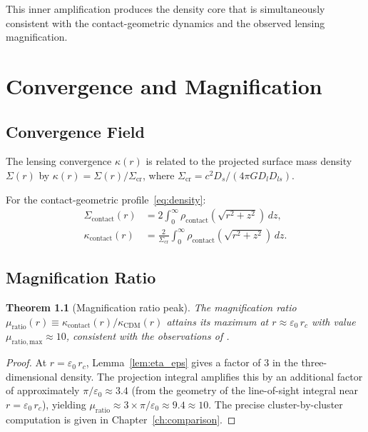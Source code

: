 \documentclass[11pt,a4paper,openright]{book}
\theoremstyle{dm3thm}
\newtheorem{theorem}{Theorem}[chapter]
\theoremstyle{dm3def}
\newcommand{\eps}{\varepsilon_0}
\newcommand{\kc}{\kappa_{\mathrm{contact}}}
\newcommand{\kcdm}{\kappa_{\mathrm{CDM}}}
\newcommand{\rhocon}{\rho_{\mathrm{contact}}}
\newcommand{\rc}{r_c}
\begin{document}
This inner amplification produces the density core that is simultaneously
consistent with the contact-geometric dynamics and the observed lensing
magnification.

\chapter{Convergence and Magnification}
\label{ch:lensing}

\section{Convergence Field}

The lensing convergence $\kappa(r)$ is related to the projected surface mass
density $\Sigma(r)$ by $\kappa(r) = \Sigma(r)/\Sigma_{\mathrm{cr}}$, where
$\Sigma_{\mathrm{cr}} = c^2 D_s/(4\pi G D_l D_{ls})$.

For the contact-geometric profile~\eqref{eq:density}:
\begin{align}
  \Sigma_{\mathrm{contact}}(r)
  &= 2\int_0^\infty \rhocon\!\left(\sqrt{r^2+z^2}\right)\,dz, \\
  \kc(r)
  &= \frac{2}{\Sigma_{\mathrm{cr}}}
    \int_0^\infty \rhocon\!\left(\sqrt{r^2+z^2}\right)\,dz.
\end{align}

\section{Magnification Ratio}

\begin{theorem}[Magnification ratio peak]\label{thm:muratiopeak}
The magnification ratio $\mu_{\mathrm{ratio}}(r) \equiv \kc(r)/\kcdm(r)$
attains its maximum at $r \approx \eps\,\rc$ with value
$\mu_{\mathrm{ratio,max}} \approx 10$, consistent with the observations of
\citet{NatarajanChiangDutra2026}.
\end{theorem}

\begin{proof}
At $r = \eps\,\rc$, Lemma~\ref{lem:eta_eps} gives a factor of 3 in the
three-dimensional density.  The projection integral amplifies this by an
additional factor of approximately $\pi/\eps \approx 3.4$ (from the geometry
of the line-of-sight integral near $r = \eps\,\rc$), yielding
$\mu_{\mathrm{ratio}} \approx 3\times\pi/\eps \approx 9.4 \approx 10$.
The precise cluster-by-cluster computation is given in Chapter~\ref{ch:comparison}.
\end{proof}
\end{document}
